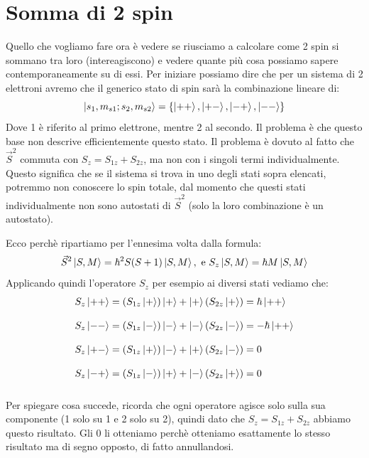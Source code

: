 \section{Somma di 2 spin}

Quello che vogliamo fare ora è vedere se riusciamo a calcolare come 2 spin si sommano tra loro (intereagiscono) e vedere quante più cosa possiamo sapere contemporaneamente su di essi.
Per iniziare possiamo dire che per un sistema di 2 elettroni avremo che il generico stato di spin sarà la combinazione lineare di:
$$\ket{s_1,m_{s1};s_2,m_{s2}} = \left\{\ket{++}, \ket{+-}, \ket{-+}, \ket{--}\right\}$$
Dove 1 è riferito al primo elettrone, mentre 2 al secondo. Il problema è che questo base non descrive efficientemente questo stato. Il problema è dovuto al fatto che $\vec{S}^2$ commuta con $S_z = S_{1z} + S_{2z}$, ma non con i singoli termi individualmente. Questo significa che se il sistema si trova in uno degli stati sopra elencati, potremmo non conoscere lo spin totale, dal momento che questi stati individualmente non sono autostati di $\vec{S}^2$ (solo la loro combinazione è un autostato).

Ecco perchè ripartiamo per l'ennesima volta dalla formula:
$$\vec{S}^2 \ket{S, M} = \hbar^2S(S+1)\ket{S, M}, \text{ e } S_z\ket{S,M} = \hbar M\ket{S,M}$$
Applicando quindi l'operatore $S_z$ per esempio ai diversi stati vediamo che:
$$\begin{array}{l}
	S_z\ket{++} = (S_{1z} \ket{+}) \ket{+} + \ket{+} (S_{2z}\ket{+}) = \hbar\ket{++}\\\\
	S_z\ket{--} = (S_{1z} \ket{-}) \ket{-} + \ket{-} (S_{2z}\ket{-}) = -\hbar\ket{++}\\\\
	S_z\ket{+-} = (S_{1z} \ket{+}) \ket{-} + \ket{+} (S_{2z}\ket{-}) = 0\\\\
	S_z\ket{-+} = (S_{1z} \ket{-}) \ket{+} + \ket{-} (S_{2z}\ket{+}) = 0\\\\
\end{array}$$
Per spiegare cosa succede, ricorda che ogni operatore agisce solo sulla sua componente (1 solo su 1 e 2 solo su 2), quindi dato che $S_z = S_{1z} + S_{2z}$ abbiamo questo risultato. Gli 0 li otteniamo perchè otteniamo esattamente lo stesso risultato ma di segno opposto, di fatto annullandosi.	

